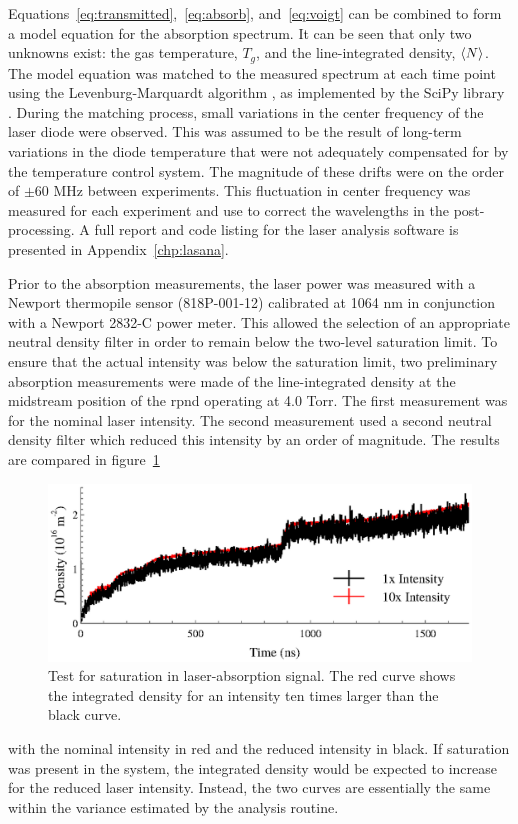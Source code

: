 Equations~\ref{eq:transmitted},~\ref{eq:absorb}, and~\ref{eq:voigt} can be
combined to form a model equation for the absorption spectrum. It can be seen
that only two unknowns exist: the gas temperature, $T_g$, and the
line-integrated density, $\langle N \rangle$. The model equation was matched to the measured
spectrum at each time point using the Levenburg-Marquardt algorithm
\cite{Marquardt1963}, as implemented by the SciPy library \cite{Jones2001}.
During the matching process, small variations in the center frequency of the
laser diode were observed. This was assumed to be the result of long-term
variations in the diode temperature that were not adequately compensated for by
the temperature control system. The magnitude of these drifts were on the order
of $\pm60$ MHz between experiments. This fluctuation in center frequency was
measured for each experiment and use to correct the wavelengths in the
post-processing. A full report and code listing for the laser analysis software
is presented in Appendix~\ref{chp:lasana}.

Prior to the absorption measurements, the laser power was measured with a
Newport thermopile sensor (818P-001-12) calibrated at 1064 nm in conjunction
with a Newport 2832-C power meter. This allowed the selection of an appropriate
neutral density filter in order to remain below the two-level saturation limit.
To ensure that the actual intensity was below the saturation limit, two
preliminary absorption measurements were made of the line-integrated density at
the midstream position of the \acs{rpnd} operating at 4.0 Torr. The first
measurement was for the nominal laser intensity. The second measurement used a
second neutral density filter which reduced this intensity by an order of
magnitude. The results are compared in figure~\ref{fig:saturation}
\begin{figure}
  \centering
  \includegraphics{./chapters/metastables/figures/saturation.eps}
  \caption{Test for saturation in laser-absorption signal. The red curve shows
    the integrated density for an intensity ten times larger than the black
    curve.}
  \label{fig:saturation}
\end{figure}
with the nominal intensity in red and the reduced intensity in black. If
saturation was present in the system, the integrated density would be expected
to increase for the reduced laser intensity. Instead, the two curves are
essentially the same within the variance estimated by the analysis routine.

